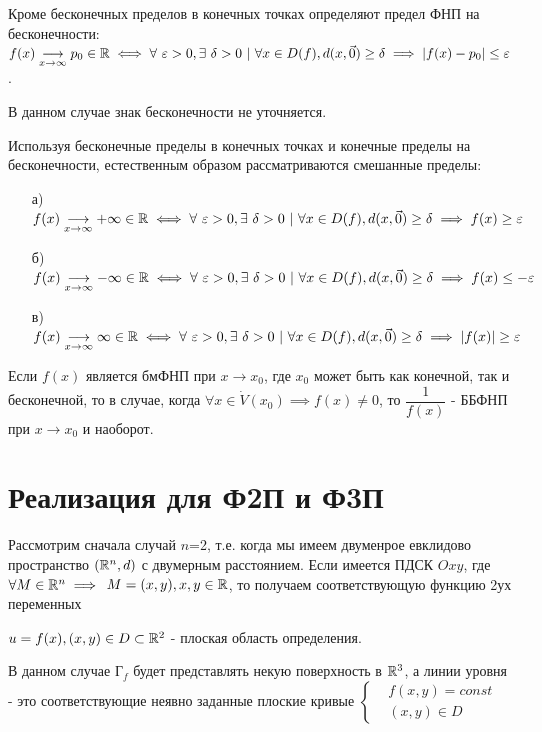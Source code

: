 \documentclass[../../main.tex]{subfiles}
\begin{document}
Кроме бесконечных пределов в конечных точках определяют предел ФНП на бесконечности:
$f(x)\underset{x \to \infty}{\longrightarrow}  p_0 \in \mathbb{R} \iff
\forall\ \varepsilon > 0, \exists\ \delta > 0\ |\
\forall x \in D(f), d(x, \vec{0}) \geq \delta
\implies |f(x) - p_0| \leq \varepsilon$.

В данном случае знак бесконечности не уточняется.

Используя бесконечные пределы в конечных точках и конечные пределы на бесконечности,
естественным образом рассматриваются смешанные пределы:

\begin{itemize}
	\item[а)] $f(x)\underset{x \to \infty}{\longrightarrow} +\infty \in \mathbb{R} \iff
	\forall\ \varepsilon > 0, \exists\ \delta > 0\ |\
	\forall x \in D(f), d(x, \vec{0}) \geq \delta
	\implies f(x) \geq \varepsilon$
	\item[б)] $f(x)\underset{x \to \infty}{\longrightarrow} -\infty \in \mathbb{R} \iff
	\forall\ \varepsilon > 0, \exists\ \delta > 0\ |\
	\forall x \in D(f), d(x, \vec{0}) \geq \delta
	\implies f(x) \leq -\varepsilon$
	\item[в)] $f(x)\underset{x \to \infty}{\longrightarrow} \infty \in \mathbb{R} \iff
	\forall\ \varepsilon > 0, \exists\ \delta > 0\ |\
	\forall x \in D(f), d(x, \vec{0}) \geq \delta
	\implies |f(x)| \geq \varepsilon$
\end{itemize}
	
Если $f(x)$ является бмФНП при $x \to x_0$, где $x_0$ может быть как конечной,
так и бесконечной, то в случае, когда $\forall x \in \dot{V}{(x_0)} \implies
f(x) \ne 0$, то $\dfrac{1}{f(x)}$ - ББФНП при $x \to x_0$ и наоборот.
	
\section{Реализация для Ф2П и Ф3П}	

Рассмотрим сначала случай $n$=2, т.е. когда мы имеем двуменрое евклидово
пространство $(\mathbb{R}^n, d)$ с двумерным расстоянием. Если имеется ПДСК $Oxy$, где
$\forall M \in \mathbb{R}^n \implies$
$M = (x, y), x, y \in \mathbb{R}$, то получаем
соответствующую функцию 2ух переменных 

$u = f(x), (x, y) \in D \subset \mathbb{R}^2$ -
плоская область определения.

В данном случае $\text{Г}_f$ будет представлять некую поверхность в $\mathbb{R}^3$,
а линии уровня - это соответствующие неявно заданные плоские кривые
$\left\{\begin{aligned}
	&f(x, y) = const \\
	&(x, y) \in D
\end{aligned}\right.$
\end{document}
